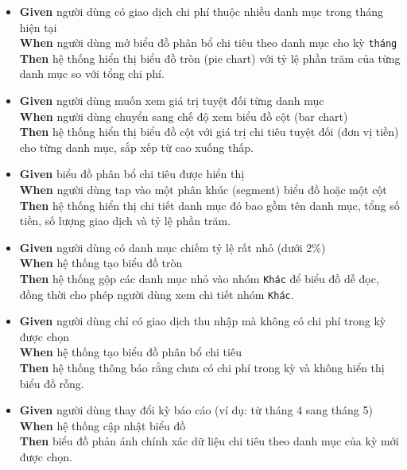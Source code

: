 \begin{itemize}
\item \textbf{Given} người dùng có giao dịch chi phí thuộc nhiều danh mục trong tháng hiện tại  \\ \hspace*{1.5em}  \textbf{When} người dùng mở biểu đồ phân bổ chi tiêu theo danh mục cho kỳ \texttt{tháng}  \\ \hspace*{1.5em}  \textbf{Then} hệ thống hiển thị biểu đồ tròn (pie chart) với tỷ lệ phần trăm của từng danh mục so với tổng chi phí.
\item \textbf{Given} người dùng muốn xem giá trị tuyệt đối từng danh mục  \\ \hspace*{1.5em}  \textbf{When} người dùng chuyển sang chế độ xem biểu đồ cột (bar chart)  \\ \hspace*{1.5em}  \textbf{Then} hệ thống hiển thị biểu đồ cột với giá trị chi tiêu tuyệt đối (đơn vị tiền) cho từng danh mục, sắp xếp từ cao xuống thấp.
\item \textbf{Given} biểu đồ phân bổ chi tiêu được hiển thị  \\ \hspace*{1.5em}  \textbf{When} người dùng tap vào một phân khúc (segment) biểu đồ hoặc một cột  \\ \hspace*{1.5em}  \textbf{Then} hệ thống hiển thị chi tiết danh mục đó bao gồm tên danh mục, tổng số tiền, số lượng giao dịch và tỷ lệ phần trăm.
\item \textbf{Given} người dùng có danh mục chiếm tỷ lệ rất nhỏ (dưới 2\%)  \\ \hspace*{1.5em}  \textbf{When} hệ thống tạo biểu đồ tròn  \\ \hspace*{1.5em}  \textbf{Then} hệ thống gộp các danh mục nhỏ vào nhóm \texttt{Khác} để biểu đồ dễ đọc, đồng thời cho phép người dùng xem chi tiết nhóm \texttt{Khác}.
\item \textbf{Given} người dùng chỉ có giao dịch thu nhập mà không có chi phí trong kỳ được chọn  \\ \hspace*{1.5em}  \textbf{When} hệ thống tạo biểu đồ phân bổ chi tiêu  \\ \hspace*{1.5em}  \textbf{Then} hệ thống thông báo rằng chưa có chi phí trong kỳ và không hiển thị biểu đồ rỗng.
\item \textbf{Given} người dùng thay đổi kỳ báo cáo (ví dụ: từ tháng 4 sang tháng 5)  \\ \hspace*{1.5em}  \textbf{When} hệ thống cập nhật biểu đồ  \\ \hspace*{1.5em}  \textbf{Then} biểu đồ phản ánh chính xác dữ liệu chi tiêu theo danh mục của kỳ mới được chọn.
\end{itemize}
